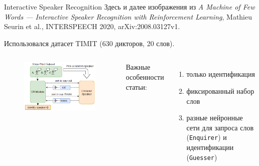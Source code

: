 \documentclass[aspectratio=43]{beamer}
\newcommand{\guesser}{\texttt{Guesser}}
\newcommand{\enquirer}{\texttt{Enquirer}}
\begin{document}
\begin{frame}{Interactive Speaker Recognition}
    Здесь и далее изображения из \textit{A Machine of Few Words --- Interactive
    Speaker Recognition with Reinforcement Learning}, Mathieu Seurin et al.,
    INTERSPEECH 2020, arXiv:2008.03127v1.\vspace{1em}

    Использовался датасет TIMIT (630 дикторов, 20 слов).\vspace{1em}

    \begin{columns}

    \begin{figure}[bht]
        \includegraphics[width=.9\textwidth]{isr_game_large.png}
    \end{figure}

    Важные особенности статьи:
    \begin{enumerate}
        \item только идентификация
        \item фиксированный набор слов
        \item разные нейронные сети для запроса слов (\enquirer) и идентификации (\guesser)
    \end{enumerate}

    \end{columns}
\end{frame}
\end{document}
